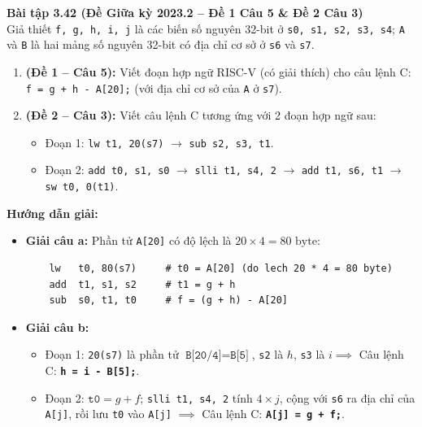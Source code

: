 \textbf{Bài tập 3.42 (Đề Giữa kỳ 2023.2 -- Đề 1 Câu 5 \& Đề 2 Câu 3)}\\
Giả thiết \texttt{f, g, h, i, j} là các biến số nguyên 32-bit ở \texttt{s0, s1, s2, s3, s4}; \texttt{A} và \texttt{B} là hai mảng số nguyên 32-bit có địa chỉ cơ sở ở \texttt{s6} và \texttt{s7}.
\begin{enumerate}[label=\alph*)]
    \item \textbf{(Đề 1 -- Câu 5):} Viết đoạn hợp ngữ RISC-V (có giải thích) cho câu lệnh C: \texttt{f = g + h - A[20];} (với địa chỉ cơ sở của \texttt{A} ở \texttt{s7}).
    \item \textbf{(Đề 2 -- Câu 3):} Viết câu lệnh C tương ứng với 2 đoạn hợp ngữ sau:
    \begin{itemize}
        \item Đoạn 1: \texttt{lw t1, 20(s7)} $\rightarrow$ \texttt{sub s2, s3, t1}.
        \item Đoạn 2: \texttt{add t0, s1, s0} $\rightarrow$ \texttt{slli t1, s4, 2} $\rightarrow$ \texttt{add t1, s6, t1} $\rightarrow$ \texttt{sw t0, 0(t1)}.
    \end{itemize}
\end{enumerate}
\textbf{Hướng dẫn giải:}
\begin{itemize}
    \item \textbf{Giải câu a:} Phần tử \texttt{A[20]} có độ lệch là $20 \times 4 = 80\text{ byte}$:

\noindent\begin{minipage}{\linewidth}
\begin{lstlisting}
    lw   t0, 80(s7)     # t0 = A[20] (do lech 20 * 4 = 80 byte)
    add  t1, s1, s2     # t1 = g + h
    sub  s0, t1, t0     # f = (g + h) - A[20]
\end{lstlisting}
\end{minipage}

    \item \textbf{Giải câu b:}
    \begin{itemize}
        \item Đoạn 1: \texttt{20(s7)} là phần tử $\texttt{B[20/4]} = \texttt{B[5]}$, \texttt{s2} là $h$, \texttt{s3} là $i \implies$ Câu lệnh C: \textbf{\texttt{h = i - B[5];}}.
        \item Đoạn 2: $\texttt{t0} = g + f$; \texttt{slli t1, s4, 2} tính $4 \times j$, cộng với \texttt{s6} ra địa chỉ của \texttt{A[j]}, rồi lưu \texttt{t0} vào \texttt{A[j]} $\implies$ Câu lệnh C: \textbf{\texttt{A[j] = g + f;}}.
    \end{itemize}
\end{itemize}

